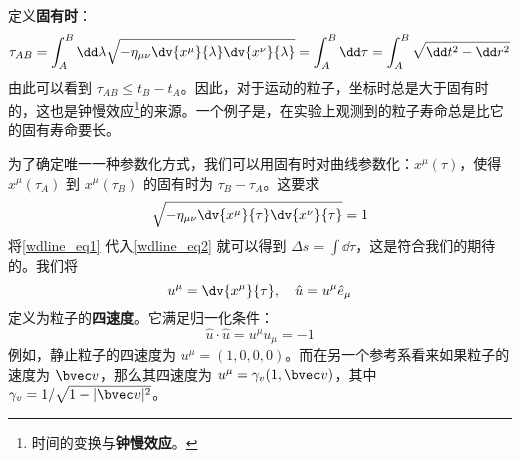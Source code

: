 定义\textbf{固有时}：
\begin{equation}
\tau_{AB}=\int_{A}^{B} \dd\lambda \sqrt{-\eta_{\mu\nu}\dv{x^\mu}{\lambda} \dv{x^\nu}{\lambda}}=\int_A^B \dd \tau = \int_A^B \sqrt{\dd t^2-\dd r^2}
\end{equation}
由此可以看到 $\tau_{AB}\le t_B-t_A$。因此，对于运动的粒子，坐标时总是大于固有时的，这也是钟慢效应\footnote{时间的变换与\textbf{钟慢效应}。}的来源。一个例子是，在实验上观测到的粒子寿命总是比它的固有寿命要长。

为了确定唯一一种参数化方式，我们可以用固有时对曲线参数化：$x^\mu(\tau)$，使得 $x^\mu(\tau_A)$ 到 $x^\mu(\tau_B)$ 的固有时为 $\tau_B-\tau_A$。这要求
\begin{equation}\label{wdline_eq1}
\sqrt{-\eta_{\mu\nu}\dv{x^\mu}{\tau} \dv{x^\nu}{\tau}}=1
\end{equation}
将\autoref{wdline_eq1} 代入\autoref{wdline_eq2} 就可以得到 $\Delta s=\int \dd \tau$，这是符合我们的期待的。我们将
\begin{equation}
u^\mu=\dv{x^\mu}{\tau},\quad \hat u=u^\mu \hat{e}_\mu
\end{equation}
定义为粒子的\textbf{四速度}。它满足归一化条件：
\begin{equation}
\hat u \cdot \hat u = u^\mu u_\mu = -1
\end{equation}
例如，静止粒子的四速度为 $u^\mu=(1,0,0,0)$。而在另一个参考系看来如果粒子的速度为 $\bvec v$，那么其四速度为 $u^\mu=\gamma_v(1,\bvec v)$，其中 $\gamma_v=1/\sqrt{1-|\bvec v|^2}$。

